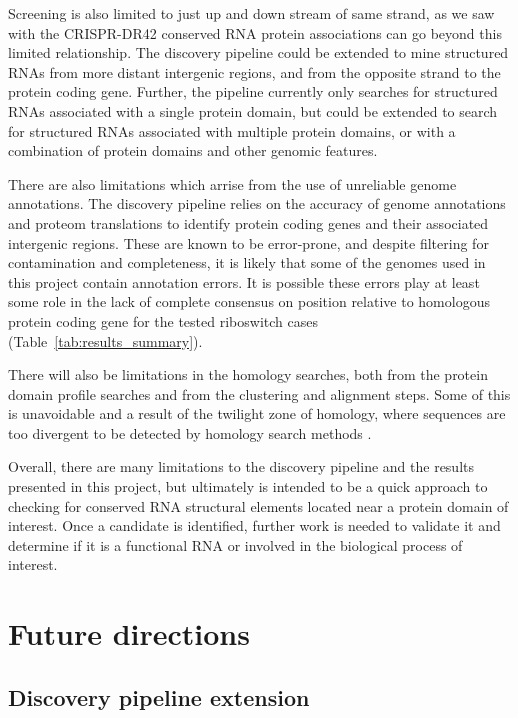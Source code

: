 Screening is also limited to just up and down stream of same strand, as we saw with the CRISPR-DR42 conserved RNA protein associations can go beyond this limited relationship.
The discovery pipeline could be extended to mine structured RNAs from more distant intergenic regions, and from the opposite strand to the protein coding gene.
Further, the pipeline currently only searches for structured RNAs associated with a single protein domain, but could be extended to search for structured RNAs associated with multiple protein domains, or with a combination of protein domains and other genomic features.

There are also limitations which arrise from the use of unreliable genome annotations.
The discovery pipeline relies on the accuracy of genome annotations and proteom translations to identify protein coding genes and their associated intergenic regions.
These are known to be error-prone\citep{Salzberg2019}, and despite filtering for contamination and completeness, it is likely that some of the genomes used in this project contain annotation errors.
It is possible these errors play at least some role in the lack of complete consensus on position relative to homologous protein coding gene for the tested riboswitch cases (Table~\ref{tab:results_summary}).

There will also be limitations in the homology searches, both from the protein domain profile searches and from the clustering and alignment steps.
Some of this is unavoidable and a result of the twilight zone of homology, where sequences are too divergent to be detected by homology search methods \citep{Rost1999,McGimpsey2019}.

Overall, there are many limitations to the discovery pipeline and the results presented in this project, but ultimately is intended to be a quick approach to checking for conserved RNA structural elements located near a protein domain of interest.
Once a candidate is identified, further work is needed to validate it and determine if it is a functional RNA or involved in the biological process of interest.

\section{Future directions}

\subsection{Discovery pipeline extension}

